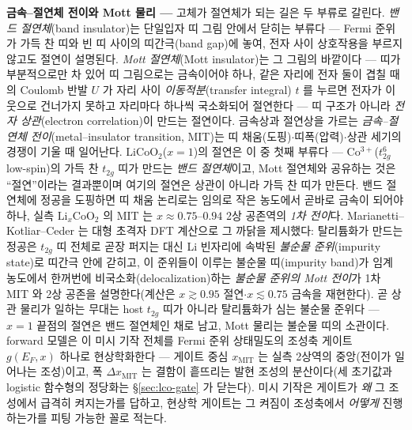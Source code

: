 \begin{bgbox}
\textbf{금속--절연체 전이와 Mott 물리 ---} 고체가 절연체가 되는 길은 두 부류로 갈린다.
\emph{밴드 절연체}(band insulator)는 단일입자 띠 그림 안에서 닫히는 부류다 --- Fermi 준위가 가득 찬 띠와
빈 띠 사이의 띠간극(band gap)에 놓여, 전자 사이 상호작용을 부르지 않고도 절연이 설명된다.
\emph{Mott 절연체}(Mott insulator)는 그 그림의 바깥이다 --- 띠가 부분적으로만 차 있어 띠 그림으로는
금속이어야 하나, 같은 자리에 전자 둘이 겹칠 때의 Coulomb 반발 $U$ 가 자리 사이 \emph{이동적분}(transfer
integral) $t$ 를 누르면 전자가 이웃으로 건너가지 못하고 자리마다 하나씩 국소화되어 절연한다 --- 띠 구조가
아니라 \emph{전자 상관}(electron correlation)이 만드는 절연이다\cite{mott1968,imada1998}. 금속상과 절연상을
가르는 \emph{금속--절연체 전이}(metal--insulator transition, MIT)는 띠 채움(도핑)$\cdot$띠폭(압력)$\cdot$상관
세기의 경쟁이 기울 때 일어난다\cite{imada1998}. $\mathrm{LiCoO_2}$($x{=}1$)의 절연은 이 중 첫째 부류다 ---
Co$^{3+}$($t_{2g}^6$ low-spin)의 가득 찬 $t_{2g}$ 띠가 만드는 \emph{밴드 절연체}이고\cite{menetrier1999},
Mott 절연체와 공유하는 것은 ``절연''이라는 결과뿐이며 여기의 절연은 상관이 아니라 가득 찬 띠가 만든다.
밴드 절연체에 정공을 도핑하면 띠 채움 논리로는 임의로 작은 농도에서 곧바로 금속이 되어야 하나, 실측
$\mathrm{Li}_x\mathrm{CoO_2}$ 의 MIT 는 $x\approx0.75$--$0.94$ 2상 공존역의 \emph{1차
전이}다\cite{menetrier1999,reimers1992,motohashi2009}. Marianetti--Kotliar--Ceder 는 대형 초격자 DFT 계산으로
그 까닭을 제시했다: 탈리튬화가 만드는 정공은 $t_{2g}$ 띠 전체로 곧장 퍼지는 대신 Li 빈자리에 속박된
\emph{불순물 준위}(impurity state)로 띠간극 안에 갇히고, 이 준위들이 이루는 불순물 띠(impurity band)가 임계
농도에서 한꺼번에 비국소화(delocalization)하는 \emph{불순물 준위의 Mott 전이}가 1차 MIT 와 2상 공존을
설명한다\cite{marianetti2004}(계산은 $x\gtrsim0.95$ 절연$\cdot$$x\lesssim0.75$ 금속을 재현한다). 곧 상관
물리가 일하는 무대는 host $t_{2g}$ 띠가 아니라 탈리튬화가 심는 불순물 준위다 --- $x{=}1$ 끝점의 절연은 밴드
절연체인 채로 남고, Mott 물리는 불순물 띠의 소관이다. forward 모델은 이 미시 기작 전체를 Fermi 준위
상태밀도의 조성축 게이트 $g(E_F,x)$ 하나로 현상학화한다 --- 게이트 중심 $x_\mathrm{MIT}$ 는 실측 2상역의
중앙(전이가 일어나는 조성)이고, 폭 $\Delta x_\mathrm{MIT}$ 는 결함이 흩뜨리는 발현 조성의 분산이다(세
초기값과 logistic 함수형의 정당화는 \S\ref{sec:lco-gate} 가 닫는다). 미시 기작은 게이트가 \emph{왜} 그
조성에서 급격히 켜지는가를 답하고, 현상학 게이트는 그 켜짐이 조성축에서 \emph{어떻게} 진행하는가를 피팅
가능한 꼴로 적는다.
\end{bgbox}

